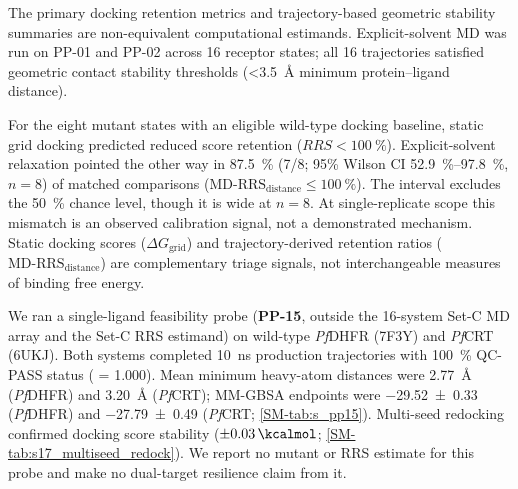 \documentclass[11pt,a4paper]{article}
\begin{document}
The primary docking retention metrics and trajectory-based geometric stability summaries are non-equivalent computational estimands. Explicit-solvent MD was run on PP-01 and PP-02 across 16 receptor states; all 16 trajectories satisfied geometric contact stability thresholds (\qty{<3.5}{\angstrom} minimum protein--ligand distance).

For the eight mutant states with an eligible wild-type docking baseline, static grid docking predicted reduced score retention ($RRS < \qty{100}{\percent}$). Explicit-solvent relaxation pointed the other way in \qty{87.5}{\percent} (7/8; 95\% Wilson CI \qtyrange{52.9}{97.8}{\percent}, $n=\num{8}$) of matched comparisons ($\mathrm{MD\text{-}RRS}_{\mathrm{distance}} \le \qty{100}{\percent}$). The interval excludes the \qty{50}{\percent} chance level, though it is wide at $n=\num{8}$. At single-replicate scope this mismatch is an observed calibration signal, not a demonstrated mechanism. Static docking scores ($\Delta G_{\mathrm{grid}}$) and trajectory-derived retention ratios ($\mathrm{MD\text{-}RRS}_{\mathrm{distance}}$) are complementary triage signals, not interchangeable measures of binding free energy.

We ran a single-ligand feasibility probe (\textbf{PP-15}, outside the 16-system Set-C MD array and the Set-C RRS estimand) on wild-type \textit{Pf}DHFR (7F3Y) and \textit{Pf}CRT (6UKJ). Both systems completed \qty{10}{\ns} production trajectories with \qty{100}{\percent} QC-PASS status ( = \num{1.000}). Mean minimum heavy-atom distances were \qty{2.77}{\angstrom} (\textit{Pf}DHFR) and \qty{3.20}{\angstrom} (\textit{Pf}CRT); MM-GBSA endpoints were \qty{-29.52 \pm 0.33}{\kcalmol} (\textit{Pf}DHFR) and \qty{-27.79 \pm 0.49}{\kcalmol} (\textit{Pf}CRT; \cref{SM-tab:s_pp15}). Multi-seed redocking confirmed docking score stability ($\pm\qty{0.03}{\kcalmol}$; \cref{SM-tab:s17_multiseed_redock}). We report no mutant or RRS estimate for this probe and make no dual-target resilience claim from it.
\end{document}
